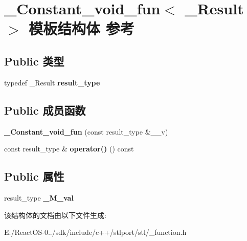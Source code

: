 \hypertarget{struct___constant__void__fun}{}\section{\+\_\+\+Constant\+\_\+void\+\_\+fun$<$ \+\_\+\+Result $>$ 模板结构体 参考}
\label{struct___constant__void__fun}
\subsection*{Public 类型}
\begin{DoxyCompactItemize}
\item 
\mbox{\label{struct___constant__void__fun_a8fb6ba3ea2fa139640a102eb42c22ff0}} 
typedef \+\_\+\+Result {\bfseries result\+\_\+type}
\end{DoxyCompactItemize}
\subsection*{Public 成员函数}
\begin{DoxyCompactItemize}
\item 
\mbox{\label{struct___constant__void__fun_a3f7a354fbd907d96fa66a43f7b719e6e}} 
{\bfseries \+\_\+\+Constant\+\_\+void\+\_\+fun} (const result\+\_\+type \&\+\_\+\+\_\+v)
\item 
\mbox{\label{struct___constant__void__fun_a19d0058334dfdd993369f9abd6b2359f}} 
const result\+\_\+type \& {\bfseries operator()} () const
\end{DoxyCompactItemize}
\subsection*{Public 属性}
\begin{DoxyCompactItemize}
\item 
\mbox{\label{struct___constant__void__fun_a940888bbe2a7b3636b9506ab1916c8d5}} 
result\+\_\+type {\bfseries \+\_\+\+M\+\_\+val}
\end{DoxyCompactItemize}


该结构体的文档由以下文件生成\+:\begin{DoxyCompactItemize}
\item 
E\+:/\+React\+O\+S-\/0../sdk/include/c++/stlport/stl/\+\_\+function.\+h\end{DoxyCompactItemize}
